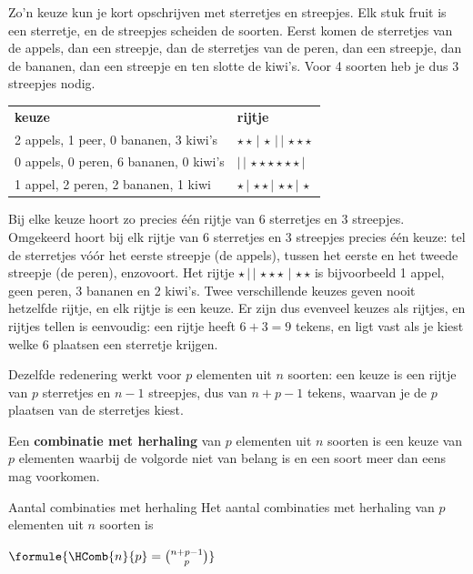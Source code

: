 Zo'n keuze kun je kort opschrijven met sterretjes en streepjes. Elk stuk fruit is een sterretje, en de streepjes scheiden de soorten. Eerst komen de sterretjes van de appels, dan een streepje, dan de sterretjes van de peren, dan een streepje, dan de bananen, dan een streepje en ten slotte de kiwi's. Voor 4 soorten heb je dus 3 streepjes nodig.

\begin{center}
\renewcommand{\arraystretch}{1.3}
\begin{tabular}{l@{\qquad}l}
\textbf{keuze} & \textbf{rijtje} \\
2 appels, 1 peer, 0 bananen, 3 kiwi's & $\star\star\,|\,\star\,|\,|\,\star\star\star$ \\
0 appels, 0 peren, 6 bananen, 0 kiwi's & $|\,|\,\star\star\star\star\star\star\,|$ \\
1 appel, 2 peren, 2 bananen, 1 kiwi & $\star\,|\,\star\star\,|\,\star\star\,|\,\star$
\end{tabular}
\end{center}

Bij elke keuze hoort zo precies één rijtje van 6 sterretjes en 3 streepjes. Omgekeerd hoort bij elk rijtje van 6 sterretjes en 3 streepjes precies één keuze: tel de sterretjes vóór het eerste streepje (de appels), tussen het eerste en het tweede streepje (de peren), enzovoort. Het rijtje $\star\,|\,|\,\star\star\star\,|\,\star\star$ is bijvoorbeeld 1 appel, geen peren, 3 bananen en 2 kiwi's. Twee verschillende keuzes geven nooit hetzelfde rijtje, en elk rijtje is een keuze. Er zijn dus evenveel keuzes als rijtjes, en rijtjes tellen is eenvoudig: een rijtje heeft $6 + 3 = 9$ tekens, en ligt vast als je kiest welke 6 plaatsen een sterretje krijgen.

Dezelfde redenering werkt voor $p$ elementen uit $n$ soorten: een keuze is een rijtje van $p$ sterretjes en $n - 1$ streepjes, dus van $n + p - 1$ tekens, waarvan je de $p$ plaatsen van de sterretjes kiest.

\begin{theorie}
Een \textbf{\textcolor{accent}{combinatie met herhaling}} van $p$ elementen uit $n$ soorten is een keuze van $p$ elementen waarbij de volgorde niet van belang is en een soort meer dan eens mag voorkomen.

\begin{stelling}{Aantal combinaties met herhaling}
Het aantal combinaties met herhaling van $p$ elementen uit $n$ soorten is

\vspace{1mm}
\qquad $\formule{\HComb{n}{p} = \binom{n + p - 1}{p}}$
\end{stelling}
\end{theorie}

